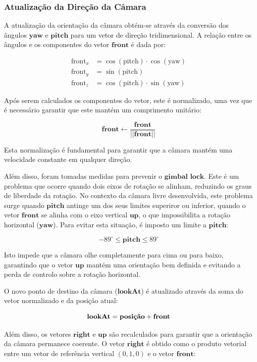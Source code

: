 \documentclass[12pt, a4paper]{article}
\begin{document}
\subsubsection{Atualização da Direção da Câmara}

A atualização da orientação da câmara obtém-se através da conversão dos ângulos $\mathbf{yaw}$ e
$\mathbf{pitch}$ para um vetor de direção tridimensional. A relação entre os ângulos e os
componentes do vetor $\mathbf{front}$ é dada por:

\[
\begin{aligned}
    \text{front}_x &= \cos(\text{pitch}) \cdot \cos(\text{yaw}) \\
    \text{front}_y &= \sin(\text{pitch}) \\
    \text{front}_z &= \cos(\text{pitch}) \cdot \sin(\text{yaw})
\end{aligned}
\]

Após serem calculados os componentes do vetor, este é normalizado, uma vez que é necessário
garantir que este mantém um comprimento unitário:

\[
\mathbf{front} \gets \frac{\mathbf{front}}{||\mathbf{front}||}
\]

Esta normalização é fundamental para garantir que a câmara mantém uma velocidade constante em
qualquer direção.

Além disso, foram tomadas medidas para prevenir o $\mathbf{gimbal}$  $\mathbf{lock}$.
Este é um problema que ocorre quando dois eixos de rotação se alinham, reduzindo
os graus de liberdade da rotação. No contexto da câmara livre desenvolvida, este problema surge
quando $\mathbf{pitch}$ antinge um dos seus limites superiror ou inferior, quando o vetor
$\mathbf{front}$ se alinha com o eixo vertical $\mathbf{up}$, o que impossibilita a rotação
horizontal ($\mathbf{yaw}$). Para evitar esta situação, é imposto um limite a $\mathbf{pitch}$:

\[
-89^\circ \leq \mathbf{pitch} \leq 89^\circ
\]

Isto impede que a câmara olhe completamente para cima ou para baixo, garantindo que o vetor
$\mathbf{up}$ mantém uma orientação bem definida e evitando a perda de controlo sobre a rotação
horizontal.

O novo ponto de destino da câmara ($\mathbf{lookAt}$) é atualizado através da soma do vetor
normalizado e da posição atual:

\[
\mathbf{lookAt} = \text{\textbf{posição}} + \mathbf{front}
\]

Além disso, os vetores $\mathbf{right}$ e $\mathbf{up}$ são recalculados para garantir que a
orientação da câmara permanece coerente. O vetor $\mathbf{right}$ é obtido como o produto
vetorial entre um vetor de referência vertical $(0,1,0)$ e o vetor $\mathbf{front}$:
\end{document}
